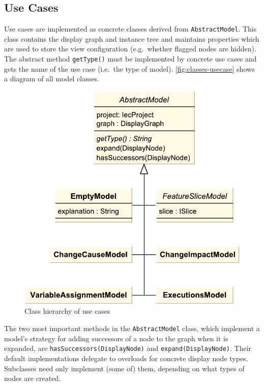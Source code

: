 \subsection{Use Cases}

Use cases are implemented as concrete classes derived from \lstinline|AbstractModel|. This class contains the display 
graph and instance tree and maintains properties which are used to store the view configuration (e.g.\ whether flagged 
nodes are hidden). The abstract method \lstinline|getType()| must be implemented by concrete use cases and gets the 
name of the use case (i.e.\ the type of model). \autoref{fig:classes-usecase} shows a diagram of all model classes.

\begin{figure}[htb]
  \centering
    \includegraphics[scale=0.6]{bilder/classes-usecase}
  \caption{Class hierarchy of use cases}
  \label{fig:classes-usecase}
\end{figure}

The two most important methods in the \lstinline|AbstractModel| class, which implement a model's strategy for adding 
successors of a node to the graph when it is expanded, are \lstinline|hasSuccessors(DisplayNode)| and 
\lstinline|expand(DisplayNode)|. Their default implementations delegate to overloads for concrete display node types. 
Subclasses need only implement (some of) them, depending on what types of nodes are created.

